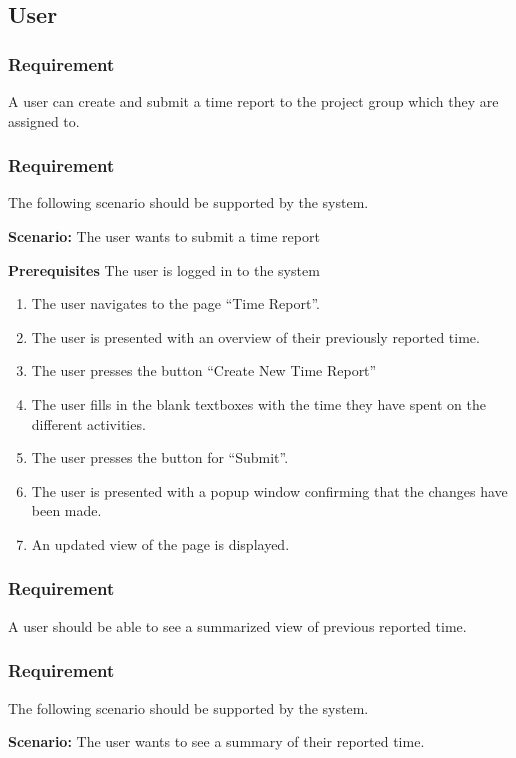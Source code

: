 \documentclass{article}
\begin{document}
\subsection{User}
\subsubsection{Requirement}
A user can create and submit a time report to the project group which they are assigned to.
\subsubsection{Requirement}
The following scenario should be supported by the system.

\textbf{Scenario:} The user wants to submit a time report

\textbf{Prerequisites} The user is logged in to the system

\begin{enumerate}


\item The user navigates to the page “Time Report”. 
\item The user is presented with an overview of their previously reported time. 
\item The user presses the button “Create New Time Report”
\item The user fills in the blank textboxes with the time they have spent on the different activities.
\item The user presses the button for “Submit”.
\item The user is presented with a popup window confirming that the changes have been made.
\item An updated view of the page is displayed.
\end{enumerate}

\subsubsection{Requirement}
A user should be able to see a summarized view of previous reported time.

\subsubsection{Requirement}
The following scenario should be supported by the system.

\textbf{Scenario:} The user wants to see a summary of their reported time.
\end{document}

